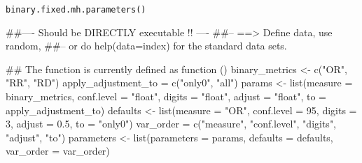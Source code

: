 \begin{Usage}
\begin{verbatim}
binary.fixed.mh.parameters()
\end{verbatim}
\end{Usage}
\begin{Examples}
\begin{ExampleCode}
##---- Should be DIRECTLY executable !! ----
##-- ==>  Define data, use random,
##--    or do  help(data=index)  for the standard data sets.

## The function is currently defined as
function () 
{
    binary_metrics <- c("OR", "RR", "RD")
    apply_adjustment_to = c("only0", "all")
    params <- list(measure = binary_metrics, conf.level = "float", 
        digits = "float", adjust = "float", to = apply_adjustment_to)
    defaults <- list(measure = "OR", conf.level = 95, digits = 3, 
        adjust = 0.5, to = "only0")
    var_order = c("measure", "conf.level", "digits", "adjust", 
        "to")
    parameters <- list(parameters = params, defaults = defaults, 
        var_order = var_order)
  }
\end{ExampleCode}
\end{Examples}

